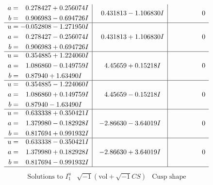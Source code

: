 \documentclass[1p]{elsarticle_modified}
\theoremstyle{definition}
\newcommand{\I}{\sqrt{-1}}
\begin{document}
$$\begin{array}{c|c|c}
\begin{aligned}
a &= \phantom{-}0.278427 + 0.256074 I \\
b &= \phantom{-}0.906983 - 0.694726 I\end{aligned}
 & \phantom{-}0.431813 - 1.106830 I & \phantom{-0.000000 } 0 \\ \hline\begin{aligned}
u &= -0.052808 - 1.271950 I \\
a &= \phantom{-}0.278427 - 0.256074 I \\
b &= \phantom{-}0.906983 + 0.694726 I\end{aligned}
 & \phantom{-}0.431813 + 1.106830 I & \phantom{-0.000000 } 0 \\ \hline\begin{aligned}
u &= \phantom{-}0.354885 + 1.224060 I \\
a &= \phantom{-}1.086860 - 0.149759 I \\
b &= \phantom{-}0.87940 + 1.63490 I\end{aligned}
 & \phantom{-}4.45659 + 0.15218 I & \phantom{-0.000000 } 0 \\ \hline\begin{aligned}
u &= \phantom{-}0.354885 - 1.224060 I \\
a &= \phantom{-}1.086860 + 0.149759 I \\
b &= \phantom{-}0.87940 - 1.63490 I\end{aligned}
 & \phantom{-}4.45659 - 0.15218 I & \phantom{-0.000000 } 0 \\ \hline\begin{aligned}
u &= \phantom{-}0.633338 + 0.350421 I \\
a &= \phantom{-}1.379980 - 0.182928 I \\
b &= \phantom{-}0.817694 + 0.991932 I\end{aligned}
 & -2.86630 - 3.64019 I & \phantom{-0.000000 } 0 \\ \hline\begin{aligned}
u &= \phantom{-}0.633338 - 0.350421 I \\
a &= \phantom{-}1.379980 + 0.182928 I \\
b &= \phantom{-}0.817694 - 0.991932 I\end{aligned}
 & -2.86630 + 3.64019 I & \phantom{-0.000000 } 0\\
 \hline 
 \end{array}$$\newpage$$\begin{array}{c|c|c}  
\text{Solutions to }I^u_{1}& \I (\text{vol} + \sqrt{-1}CS) & \text{Cusp shape}\\
 \hline 
\begin{aligned}

\end{aligned}
\end{array}$$
\end{document}
